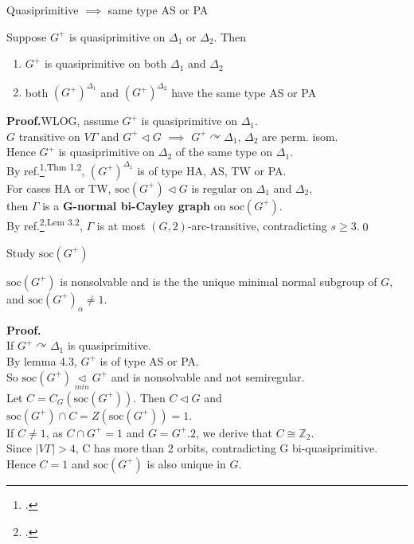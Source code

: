 \documentclass{beamer}
\def\soc{\mathrm{soc}}
\def\proof#1{\textbf{Proof.}{#1}\qed}
\begin{document}
\begin{frame}{Quasiprimitive $\implies$ same type AS or PA}
\begin{lemma}[4.3]
	Suppose $G^+$ is quasiprimitive on $\Delta_1$ or $\Delta_2$. Then \begin{enumerate}
		\item $G^+$ is quasiprimitive on both $\Delta_1$ and $\Delta_2$
		\item both $ (G^+)^{\Delta_1}$ and $ (G^+)^{\Delta_2}$ have the same type AS or PA
	\end{enumerate}
\end{lemma}
\proof{WLOG, assume $G^+$ is quasiprimitive on $\Delta_1$.\\$G$ transitive on $V\Gamma$ and $G^+\triangleleft G$ $\implies$ $G^+\curvearrowright\Delta_1$, $\Delta_2$ are perm. isom.\\Hence $G^+$ is quasiprimitive on $\Delta_2$ of the same type on $\Delta_1$.\\By ref.\footcite{GIUDICI2003analysing}\textsuperscript{,Thm 1.2}, $(G^+)^{\Delta_1}$ is of type HA, AS, TW or PA.\\For cases HA or TW, $\soc(G^+)\triangleleft G$ is regular on $\Delta_1$ and $\Delta_2$, \\then $\Gamma$ is a \textbf{G-normal bi-Cayley graph} on $\soc(G^+)$.\\By ref.\footcite{CONDER2020264}\textsuperscript{,Lem 3.2}, $\Gamma$ is at most $(G,2)$-arc-transitive, contradicting $s\geq 3$.}%
\end{frame}


\begin{frame}{Study $\soc(G^+)$}
\begin{lemma}[4.4]
$\soc(G^+)$ is nonsolvable and is the the unique minimal normal subgroup of $G$, and $\soc(G^+)_\alpha\neq 1$.
\end{lemma}
\textbf{Proof.}{\\ If $G^+\curvearrowright\Delta_1$ is quasiprimitive. \\By lemma 4.3, $G^+$ is of type AS or PA.\\So $\soc(G^+)\mathop{\triangleleft}\limits_{min}G^+$ and is nonsolvable and not semiregular.\\ Let $C=C_G(\soc(G^+))$. Then $C\triangleleft G$ and $\soc(G^+)\cap C=Z(\soc(G^+))=1$.\\If $C\neq 1$, as $C\cap G^+=1$ and $G=G^+.2$, we derive that $C\cong \mathbb{Z}_2$.\\ Since $|V\Gamma|>4$, C has more than 2 orbits, contradicting G bi-quasiprimitive.\\Hence $C=1$ and $\soc(G^+)$ is also unique in $G$.
}
\end{frame}
\end{document}
